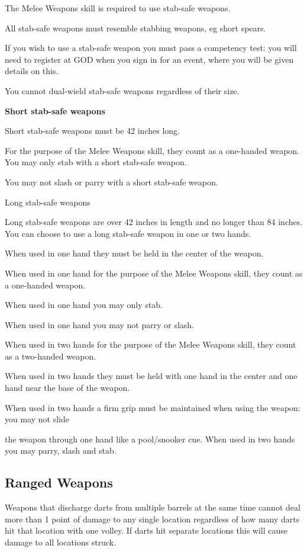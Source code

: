 The Melee Weapons skill is required to use stab-safe weapons.

All stab-safe weapons must resemble stabbing weapons, eg short spears.

If you wish to use a stab-safe weapon you must pass a competency test: you will need to register at GOD when you sign in for an event, where you will be given details on this.

You cannot dual-wield stab-safe weapons regardless of their size.

\textbf{Short stab-safe weapons}

Short stab-safe weapons must be 42 inches long.

For the purpose of the Melee Weapons skill, they count as a one-handed weapon. You may only stab with a short stab-safe weapon.

You may not slash or parry with a short stab-safe weapon.

Long stab-safe weapons

Long stab-safe weapons are over 42 inches in length and no longer than 84 inches. You can choose to use a long stab-safe weapon in one or two hands.

When used in one hand they must be held in the center of the weapon.

When used in one hand for the purpose of the Melee Weapons skill, they count as a one-handed weapon.

When used in one hand you may only stab.

When used in one hand you may not parry or slash.

When used in two hands for the purpose of the Melee Weapons skill, they count as a two-handed weapon.

When used in two hands they must be held with one hand in the center and one hand near the base of the weapon.

When used in two hands a firm grip must be maintained when using the weapon: you may not slide

the weapon through one hand like a pool/snooker cue. When used in two hands you may parry, slash and stab.

\subsection{Ranged Weapons}

Weapons that discharge darts from multiple barrels at the same time cannot deal more than 1 point of damage to any single location regardless of how many darts hit that location with one volley. If darts hit separate locations this will cause damage to all locations struck.

